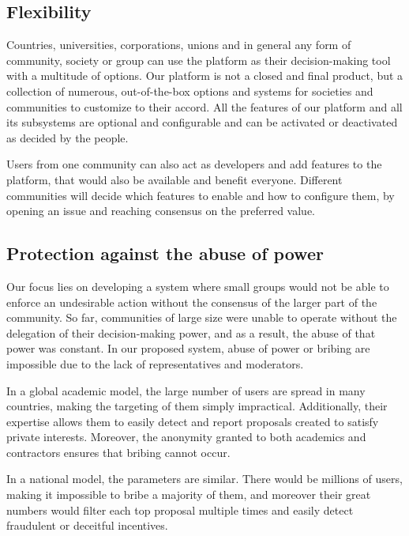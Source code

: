 \documentclass[a4paper,11pt]{article}
\begin{document}
\begin{multicols}{2}
\subsection{Flexibility} \label{flexibility}

Countries, universities, corporations, unions and in general any form of community, society or group can use the platform as their decision-making tool with a multitude of options. Our platform is not a closed and final product, but a collection of numerous, out-of-the-box options and systems for societies and communities to customize to their accord. All the features of our platform and all its subsystems are optional and configurable and can be activated or deactivated as decided by the people.

Users from one community can also act as developers and add features to the platform, that would also be available and benefit everyone. Different communities will decide which features to enable and how to configure them, by opening an issue and reaching consensus on the preferred value.

\subsection{Protection against the abuse of power} \label{abuse}

Our focus lies on developing a system where small groups would not be able to enforce an undesirable action without the consensus of the larger part of the community. So far, communities of large size were unable to operate without the delegation of their decision-making power, and as a result, the abuse of that power was constant. In our proposed system, abuse of power or bribing are impossible due to the lack of representatives and moderators.

In a global academic model, the large number of users are spread in many countries, making the targeting of them simply impractical. Additionally, their expertise allows them to easily detect and report proposals created to satisfy private interests. Moreover, the anonymity granted to both academics and contractors ensures that bribing cannot occur.

In a national model, the parameters are similar. There would be millions of users, making it impossible to bribe a majority of them, and moreover their great numbers would filter each top proposal multiple times and easily detect fraudulent or deceitful incentives.

\begin{figure}[hb]
\centering
\resizebox{20mm}{!}{}
\label{TDFlogo}
\end{figure}


\end{multicols}
\end{document}
